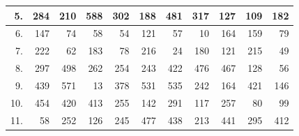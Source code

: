 \begin{table}[H]
{\begin{tabular}{|r|r|r|r|r|r|r|r|r|r|r|}
5.                     & 284                            & 210                             & 588                              & 302                              & 188                              & 481                              & 317                              & 127                              & 109                              & 182                              \\ \hline
6.                     & 147                            & 74                              & 58                               & 54                               & 121                              & 57                               & 10                               & 164                              & 159                              & 79                               \\ \hline
7.                     & 222                            & 62                              & 183                              & 78                               & 216                              & 24                               & 180                              & 121                              & 215                              & 49                               \\ \hline
8.                     & 297                            & 498                             & 262                              & 254                              & 243                              & 422                              & 476                              & 467                              & 128                              & 56                               \\ \hline
9.                     & 439                            & 571                             & 13                               & 378                              & 531                              & 535                              & 242                              & 164                              & 421                              & 146                              \\ \hline
10.                    & 454                            & 420                             & 413                              & 255                              & 142                              & 291                              & 117                              & 257                              & 80                               & 99                               \\ \hline
11.                    & 58                             & 252                             & 126                              & 245                              & 477                              & 438                              & 213                              & 441                              & 295                              & 412                              \\ \hline

\end{tabular}}
\end{table}
